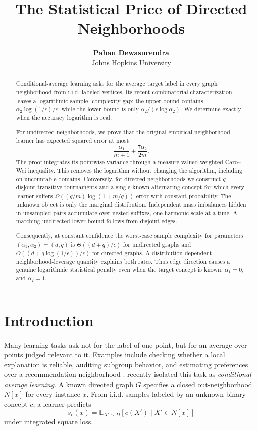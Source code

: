 \documentclass{article}
\title{The Statistical Price of Directed Neighborhoods}
\author{\textbf{Pahan Dewasurendra} \\ Johns Hopkins University}
\newcommand{\E}{\mathbb E}
\newcommand{\1}{\mathbf 1}
\begin{document}
\maketitle

\begin{abstract}
Conditional-average learning asks for the average target label in every graph neighborhood from i.i.d. labeled vertices. Its recent combinatorial characterization leaves a logarithmic sample- complexity gap: the upper bound contains $\alpha_2\log(1/\epsilon)/\epsilon$, while the lower bound is only $\alpha_2/(\epsilon\log\alpha_2)$. We determine exactly when the accuracy logarithm is real.

For undirected neighborhoods, we prove that the original empirical-neighborhood learner has expected squared error at most \[ \frac{\alpha_1}{m+1}+\frac{7\alpha_2}{2m}. \] The proof integrates its pointwise variance through a measure-valued weighted Caro--Wei inequality. This removes the logarithm without changing the algorithm, including on uncountable domains. Conversely, for directed neighborhoods we construct $q$ disjoint transitive tournaments and a single known alternating concept for which every learner suffers $\Omega((q/m)\log(1+m/q))$ error with constant probability. The unknown object is only the marginal distribution. Independent mass imbalances hidden in unsampled pairs accumulate over nested suffixes, one harmonic scale at a time. A matching undirected lower bound follows from disjoint edges.

Consequently, at constant confidence the worst-case sample complexity for parameters $(\alpha_1,\alpha_2)=(d,q)$ is $\Theta((d+q)/\epsilon)$ for undirected graphs and $\Theta((d+q\log(1/\epsilon))/\epsilon)$ for directed graphs. A distribution-dependent neighborhood-leverage quantity explains both rates. Thus edge direction causes a genuine logarithmic statistical penalty even when the target concept is known, $\alpha_1=0$, and $\alpha_2=1$.
\end{abstract}

\section{Introduction}

Many learning tasks ask not for the label of one point, but for an average over points judged relevant to it. Examples include checking whether a local explanation is reliable, auditing subgroup behavior, and estimating preferences over a recommendation neighborhood \citep{ribeiro2018,bhattacharjee2024,hardt2016}. \citet{bressan2026} recently isolated this task as \emph{conditional-average learning}. A known directed graph $G$ specifies a closed out-neighborhood $N[x]$ for every instance $x$. From i.i.d. samples labeled by an unknown binary concept $c$, a learner predicts
\begin{equation}
 s_c(x)=\E_{X'\sim D}[c(X')\mid X'\in N[x]]
 \label{eq:target}
\end{equation}
under integrated square loss.
\end{document}
